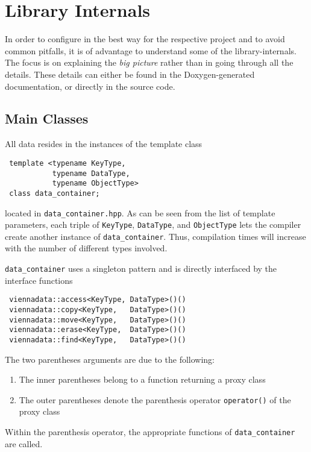 \chapter{Library Internals} \label{chap:internals}



In order to configure {\ViennaData} in the best way for the respective project and to avoid common pitfalls,
it is of advantage to understand some of the library-internals.
The focus is on explaining the \emph{big picture} rather than in going through all the details.
These details can either be found in the Doxygen-generated documentation, or directly in the source code.

\section{Main Classes}
All data resides in the instances of the template class
\begin{lstlisting}
 template <typename KeyType,
           typename DataType,
           typename ObjectType>
 class data_container;
\end{lstlisting}
located in \lstinline|data_container.hpp|.
As can be seen from the list of template parameters, each triple of \lstinline|KeyType|, \lstinline|DataType|, and \lstinline|ObjectType| lets
the compiler create another instance of \lstinline|data_container|. Thus, compilation times will increase with the number of different types involved.

\lstinline|data_container| uses a singleton pattern and is directly interfaced by the interface functions
\begin{lstlisting}
 viennadata::access<KeyType, DataType>()()
 viennadata::copy<KeyType,   DataType>()()
 viennadata::move<KeyType,   DataType>()()
 viennadata::erase<KeyType,  DataType>()()
 viennadata::find<KeyType,   DataType>()()
\end{lstlisting}
The two parentheses arguments are due to the following:
\begin{enumerate}
 \item The inner parentheses belong to a function returning a proxy class
 \item The outer parentheses denote the parenthesis operator \lstinline|operator()| of the proxy class
\end{enumerate}
Within the parenthesis operator, the appropriate functions of \lstinline|data_container| are called.

